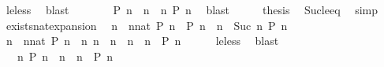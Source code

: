 \begin{isabellebody}
\ le{\isacharunderscore}less\ \isamarkupfalse%
\ blast\isanewline
\ \ \isamarkupfalse%
\ \isamarkupfalse%
\ {\isacartoucheopen}{\isachardot}{\isachardot}{\isachardot}\ {\isacharequal}\ {\isacharparenleft}P\ n\ {\isasymand}\ {\isacharparenleft}{\isasymforall}n\ {\isachargreater}\ n\ P\ n{\isacharparenright}{\isacharparenright}{\isacartoucheclose}\ \isamarkupfalse%
\ blast\isanewline
\ \ \isamarkupfalse%
\ \isamarkupfalse%
\ {\isacharquery}thesis\ \isamarkupfalse%
\ Suc{\isacharunderscore}le{\isacharunderscore}eq\ \isamarkupfalse%
\ simp\isanewline
{}\isamarkupfalse%
%
\endisatagproof
{\isafoldproof}%
%
\isadelimproof
\isanewline
%
\endisadelimproof
\isanewline
{}\isamarkupfalse%
\ exists{\isacharunderscore}nat{\isacharunderscore}expansion{\isacharcolon}\isanewline
\ \ {\isacartoucheopen}{\isacharparenleft}{\isasymexists}n\ {\isasymge}\ {\isacharparenleft}nnat{\isacharparenright}{\isachardot}\ P\ n{\isacharparenright}\ {\isacharequal}\ {\isacharparenleft}P\ n\ {\isasymor}\ {\isacharparenleft}{\isasymexists}n\ {\isasymge}\ Suc\ n\ P\ n{\isacharparenright}{\isacharparenright}{\isacartoucheclose}\isanewline
%
\isadelimproof
%
\endisadelimproof
%
\isatagproof
{}\isamarkupfalse%
\ {\isacharminus}\isanewline
\ \ \isamarkupfalse%
\ {\isacartoucheopen}{\isacharparenleft}{\isasymexists}n\ {\isasymge}\ {\isacharparenleft}nnat{\isacharparenright}{\isachardot}\ P\ n{\isacharparenright}\ {\isacharequal}\ {\isacharparenleft}{\isasymexists}n{\isachardot}\ {\isacharparenleft}n\ {\isacharequal}\ n\ {\isasymor}\ n\ {\isachargreater}\ n\ {\isasymand}\ P\ n{\isacharparenright}{\isacartoucheclose}\isanewline
\ \ \ \ \isamarkupfalse%
\ le{\isacharunderscore}less\ \isamarkupfalse%
\ blast\isanewline
\ \ \isamarkupfalse%
\ \isamarkupfalse%
\ {\isacartoucheopen}{\isachardot}{\isachardot}{\isachardot}\ {\isacharequal}\ {\isacharparenleft}{\isasymexists}n{\isachardot}\ {\isacharparenleft}P\ n\ {\isasymor}\ {\isacharparenleft}n\ {\isachargreater}\ n\ {\isasymand}\ P\ n{\isacharparenright}{\isacharparenright}{\isacartoucheclose}\ \isamarkupfalse%

\end{isabellebody}
